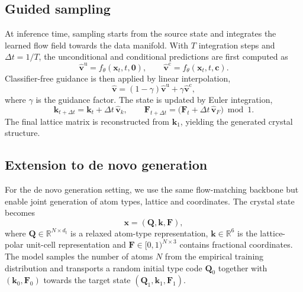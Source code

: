 \documentclass[fleqn,10pt]{wlscirep}
\begin{document}
\subsection*{Guided sampling}
At inference time, sampling starts from the source state and integrates the learned flow field towards the data manifold. With $T$ integration steps and $\Delta t = 1/T$, the unconditional and conditional predictions are first computed as
\begin{equation}
\hat{\mathbf{v}}^{\mathrm{u}} = f_{\theta}(\mathbf{x}_t, t, \mathbf{0}),
\qquad
\hat{\mathbf{v}}^{\mathrm{c}} = f_{\theta}(\mathbf{x}_t, t, \mathbf{c}).
\end{equation}
Classifier-free guidance is then applied by linear interpolation,
\begin{equation}
\hat{\mathbf{v}} = (1-\gamma)\hat{\mathbf{v}}^{\mathrm{u}} + \gamma \hat{\mathbf{v}}^{\mathrm{c}},
\end{equation}
where $\gamma$ is the guidance factor. The state is updated by Euler integration,
\begin{equation}
\mathbf{k}_{t+\Delta t} = \mathbf{k}_t + \Delta t\, \hat{\mathbf{v}}_k,
\qquad
\mathbf{F}_{t+\Delta t} = \big(\mathbf{F}_t + \Delta t\, \hat{\mathbf{v}}_F\big) \bmod 1.
\end{equation}
The final lattice matrix is reconstructed from $\mathbf{k}_1$, yielding the generated crystal structure.

\subsection*{Extension to de novo generation}
For the de novo generation setting, we use the same flow-matching backbone but enable joint generation of atom types, lattice and coordinates. The crystal state becomes
\begin{equation}
\mathbf{x} = (\mathbf{Q}, \mathbf{k}, \mathbf{F}),
\end{equation}
where $\mathbf{Q} \in \mathbb{R}^{N \times d_t}$ is a relaxed atom-type representation, $\mathbf{k} \in \mathbb{R}^{6}$ is the lattice-polar unit-cell representation and $\mathbf{F} \in [0,1)^{N \times 3}$ contains fractional coordinates. The model samples the number of atoms $N$ from the empirical training distribution and transports a random initial type code $\mathbf{Q}_0$ together with $(\mathbf{k}_0,\mathbf{F}_0)$ towards the target state $(\mathbf{Q}_1,\mathbf{k}_1,\mathbf{F}_1)$.
\end{document}
